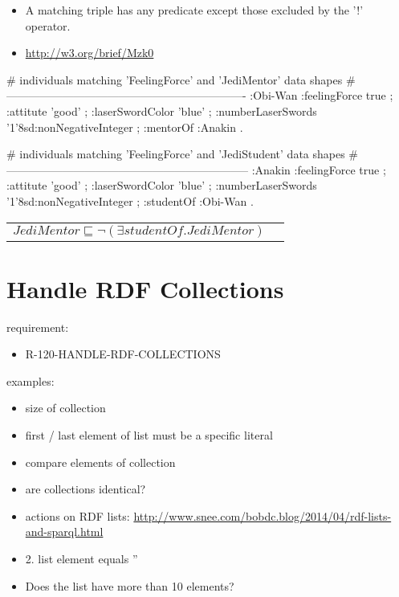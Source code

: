 \documentclass{llncs}
\newenvironment{DL}{
	\begin{center}
  \begin{tabular}{r l}

}{
  \end{tabular}
	\end{center}
}
\begin{document}
\begin{itemize}
	\item A matching triple has any predicate except those excluded by the '!' operator.
  \item \url{http://w3.org/brief/Mzk0}
\end{itemize}

\begin{ex}
# individuals matching 'FeelingForce' and 'JediMentor' data shapes
# ----------------------------------------------------------------
:Obi-Wan 
    :feelingForce true ;
    :attitute 'good' ;
    :laserSwordColor 'blue' ;
    :numberLaserSwords '1'^^xsd:nonNegativeInteger ;
    :mentorOf :Anakin .
\end{ex}

\begin{ex}
# individuals matching 'FeelingForce' and 'JediStudent' data shapes
# -----------------------------------------------------------------
:Anakin 
    :feelingForce true ;
    :attitute 'good' ;
    :laserSwordColor 'blue' ;
    :numberLaserSwords '1'^^xsd:nonNegativeInteger ;
    :studentOf :Obi-Wan .
\end{ex}

\begin{DL}
$JediMentor \sqsubseteq \neg(\exists studentOf.JediMentor)$
\end{DL}

\section{Handle RDF Collections}

requirement:

\begin{itemize}
	\item R-120-HANDLE-RDF-COLLECTIONS
\end{itemize}



examples:

\begin{itemize}
	\item size of collection
	\item first / last element of list must be a specific literal
	\item compare elements of collection
	\item are collections identical?
	\item actions on RDF lists: \url{http://www.snee.com/bobdc.blog/2014/04/rdf-lists-and-sparql.html}
	\item 2. list element equals ''
	\item Does the list have more than 10 elements?
\end{itemize}
\end{document}
